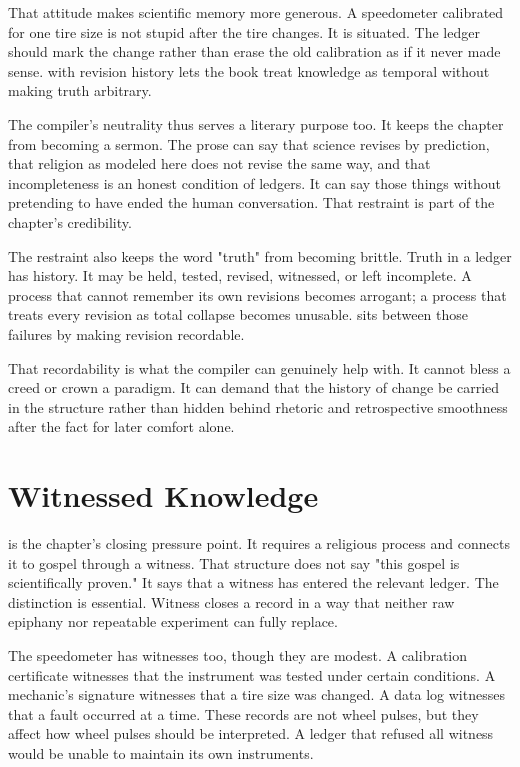 That attitude makes scientific memory more generous. A speedometer calibrated
for one tire size is not stupid after the tire changes. It is situated. The
ledger should mark the change rather than erase the old calibration as if it
never made sense.  with revision history lets the book treat
knowledge as temporal without making truth arbitrary.

The compiler's neutrality thus serves a literary purpose too. It keeps the
chapter from becoming a sermon. The prose can say that science revises by
prediction, that religion as modeled here does not revise the same way, and
that incompleteness is an honest condition of ledgers. It can say those things
without pretending to have ended the human conversation. That restraint is part
of the chapter's credibility.

The restraint also keeps the word "truth" from becoming brittle. Truth in a
ledger has history. It may be held, tested, revised, witnessed, or left
incomplete. A process that cannot remember its own revisions becomes arrogant;
a process that treats every revision as total collapse becomes unusable.
 sits between those failures by making revision recordable.

That recordability is what the compiler can genuinely help with. It cannot
bless a creed or crown a paradigm. It can demand that the history of change be
carried in the structure rather than hidden behind rhetoric and retrospective
smoothness after the fact for later comfort alone.

\section{Witnessed Knowledge}
\label{se:witnessed}

 is the chapter's closing pressure point. It requires a
religious process and connects it to gospel through a witness. That structure
does not say "this gospel is scientifically proven." It says that a witness has
entered the relevant ledger. The distinction is essential. Witness closes a
record in a way that neither raw epiphany nor repeatable experiment can fully
replace.

The speedometer has witnesses too, though they are modest. A calibration
certificate witnesses that the instrument was tested under certain conditions.
A mechanic's signature witnesses that a tire size was changed. A data log
witnesses that a fault occurred at a time. These records are not wheel pulses,
but they affect how wheel pulses should be interpreted. A ledger that refused
all witness would be unable to maintain its own instruments.

